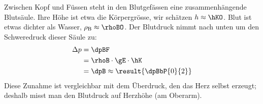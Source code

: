 Zwischen Kopf und Füssen steht in den Blutgefässen eine zusammenhängende Blutsäule. Ihre Höhe ist etwa die Körpergrösse, wir schätzen $h \approx \hKO$. Blut ist etwas dichter als Wasser, $\rho_\text{B} \approx \rhoBO$. Der Blutdruck nimmt nach unten um den Schweredruck dieser Säule zu:
\begin{align}
 \Delta p &= \dpBF \\
   &= \rhoB\cdot\gE\cdot\hK \\
   &= \dpB \approx \result{\dpBbP{0}{2}}
\end{align}
Diese Zunahme ist vergleichbar mit dem Überdruck, den das Herz selbst erzeugt; deshalb misst man den Blutdruck auf Herzhöhe (am Oberarm).
